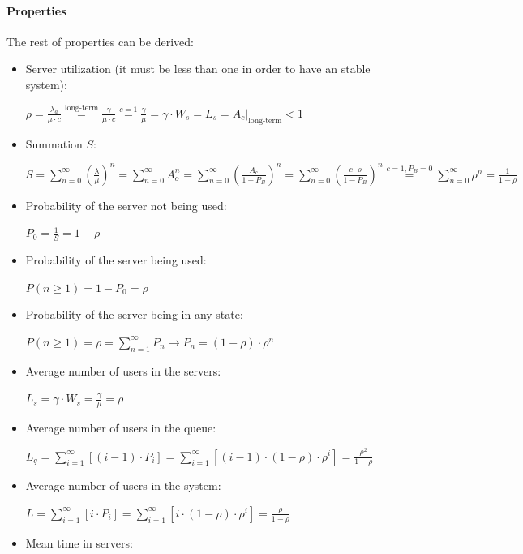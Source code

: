 \documentclass[../main.tex]{subfiles}
\begin{document}
\paragraph{Properties}

The rest of properties can be derived:

\begin{itemize}
	\item {
		Server utilization (it must be less than one in order to have an stable system):

		$
			\rho =
			\frac {\lambda_a} {\mu \cdot c} \overset {\textrm{long-term}} {=}
			\frac {\gamma} {\mu \cdot c} \overset {c=1} {=}
			\frac {\gamma} {\mu} =
			\gamma \cdot W_s =
			L_s =
			\left. A_c \right|_{\textrm{long-term}} < 1
		$
	}
	\item {
		Summation $S$:

		$
			S =
			\sum_{n=0}^{\infty} \left( \frac {\lambda} {\mu} \right)^n =
			\sum_{n=0}^{\infty} A_o^n =
			\sum_{n=0}^{\infty} \left( \frac {A_c} {1 - P_B} \right)^n =
			\sum_{n=0}^{\infty} \left( \frac {c \cdot \rho} {1 - P_B} \right)^n \overset {c=1, P_B=0} {=}
			\sum_{n=0}^{\infty} \rho^n =
			\frac {1} {1 - \rho}
		$
	}
	\item {
		Probability of the server not being used:

		$
			P_0 = \frac {1} {S} = 1 - \rho
		$
	}
	\item {
		Probability of the server being used:

		$
			P(n \geq 1) = 1 - P_0 = \rho
		$
	}
	\item {
		Probability of the server being in any state:

		$
			P(n \geq 1) = \rho = \sum_{n=1}^{\infty} P_n \rightarrow P_n = (1 - \rho) \cdot \rho^n
		$
	}
	\item {
		Average number of users in the servers:

		$
			L_s = \gamma \cdot W_s = \frac {\gamma} {\mu} = \rho
		$
	}
	\item {
		Average number of users in the queue:

		$
			L_q = \sum_{i=1}^{\infty} \left[ (i-1) \cdot P_i \right] =
			\sum_{i=1}^{\infty} \left[ (i-1) \cdot (1-\rho) \cdot \rho^i \right] =
			\frac {\rho^2} {1-\rho}
		$
	}
	\item {
		Average number of users in the system:

		$
			L = \sum_{i=1}^{\infty} \left[ i \cdot P_i \right] =
			\sum_{i=1}^{\infty} \left[ i \cdot (1-\rho) \cdot \rho^i \right] =
			\frac {\rho} {1-\rho}
		$
	}
	\item {
		Mean time in servers:

}
\end{itemize}
\end{document}
